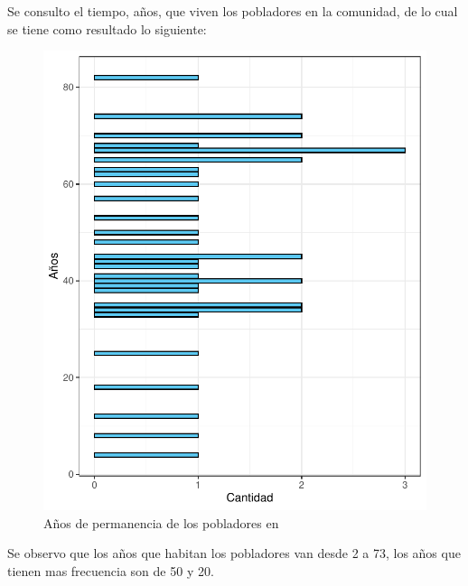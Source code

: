 \documentclass[12pt]{article}\usepackage[]{graphicx}\usepackage[]{xcolor}
\makeatletter
\def\maxwidth{ %
  \ifdim\Gin@nat@width>\linewidth
    \linewidth
  \else
    \Gin@nat@width
  \fi
}
\newenvironment{knitrout}{}{} %
\makeatother
\begin{document}
	Se consulto el tiempo, años, que viven los pobladores en la comunidad, de lo cual se tiene como resultado lo siguiente:
	\begin{figure}[H]
	\centering
\begin{knitrout}
\color{fgcolor}
\includegraphics[width=\maxwidth]{figure/cuatro-1} 
\end{knitrout}
	\caption{Años de permanencia de los pobladores en \comunidad}
	\end{figure}
	Se observo que los años que habitan los pobladores van desde 2 a 73, los años que tienen mas frecuencia son de 50 y 20.
	
\end{document}
